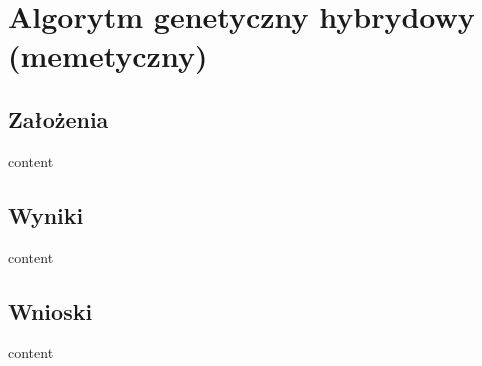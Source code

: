 \section{Algorytm genetyczny hybrydowy (memetyczny)}

\subsection{Założenia}

content

\subsection{Wyniki}

content

\subsection{Wnioski}

content
